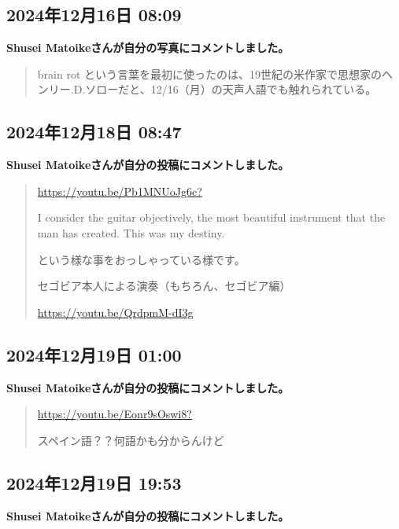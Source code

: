 \subsection*{2024年12月16日 08:09}

\textbf{Shusei Matoikeさんが自分の写真にコメントしました。}

\begin{quote}
brain rot という言葉を最初に使ったのは、19世紀の米作家で思想家のヘンリー.D.ソローだと、12/16（月）の天声人語でも触れられている。
\end{quote}

\subsection*{2024年12月18日 08:47}

\textbf{Shusei Matoikeさんが自分の投稿にコメントしました。}

\begin{quote}
\url{https://youtu.be/Pb1MNUoJg6c?}

I consider the guitar objectively, the most beautiful instrument that the man has created. This was my destiny.

という様な事をおっしゃっている様です。

セゴビア本人による演奏（もちろん、セゴビア編）

\url{https://youtu.be/QrdpmM-dI3g}
\end{quote}

\subsection*{2024年12月19日 01:00}

\textbf{Shusei Matoikeさんが自分の投稿にコメントしました。}

\begin{quote}
\url{https://youtu.be/Eonr9sOswi8?}

スペイン語？？何語かも分からんけど
\end{quote}

\subsection*{2024年12月19日 19:53}

\textbf{Shusei Matoikeさんが自分の投稿にコメントしました。}

